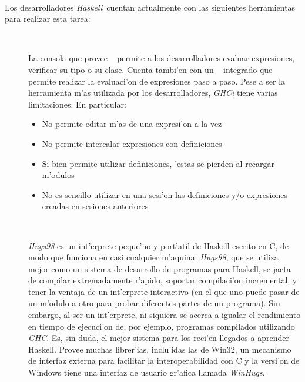 \documentclass[a4paper]{article}
\newcommand{\haskell}{\textsl{Haskell}}
\begin{document}
\paragraph{}Los desarrolladores \haskell\ cuentan actualmente con las siguientes herramientas para realizar esta tarea:
\begin{description}
	\item[~\cite{ghci}]
		La consola que provee ~\cite{ghc} permite a los desarrolladores evaluar expresiones, verificar su tipo o su clase.  Cuenta tambi'en con un ~\cite{ghcdebug} integrado que permite realizar la evaluaci'on de expresiones paso a paso.  Pese a ser la herramienta m'as utilizada por los desarrolladores, \textit{GHCi} tiene varias limitaciones.  En particular:
		\begin{itemize}
			\item No permite editar m'as de una expresi'on a la vez
			\item No permite intercalar expresiones con definiciones
			\item	Si bien permite utilizar definiciones, 'estas se pierden al recargar m'odulos
			\item No es sencillo utilizar en una sesi'on las definiciones y/o expresiones creadas en sesiones anteriores
		\end{itemize}
	\item[~\cite{hugs}]
		\textsl{Hugs98} es un int'erprete peque'no y port'atil de Haskell escrito en C, de modo que funciona en casi cualquier m'aquina. \textsl{Hugs98}, que se utiliza mejor como un sistema de desarrollo de programas para Haskell, se jacta de compilar extremadamente r'apido, soportar compilaci'on incremental, y tener la ventaja de un int'erprete interactivo (en el que uno puede pasar de un m'odulo a otro para probar diferentes partes de un programa).  Sin embargo, al ser un int'erprete, ni siquiera se acerca a igualar el rendimiento en tiempo de ejecuci'on de, por ejemplo, programas compilados utilizando \textsl{GHC}.  Es, sin duda, el mejor sistema para los reci'en llegados a aprender Haskell.  Provee muchas librer'ias, inclu'idas las de Win32, un mecanismo de interfaz externa para facilitar la interoperabilidad con C y la versi'on de Windows tiene una interfaz de usuario gr'afica llamada \textsl{WinHugs}.

\end{description}
\end{document}
